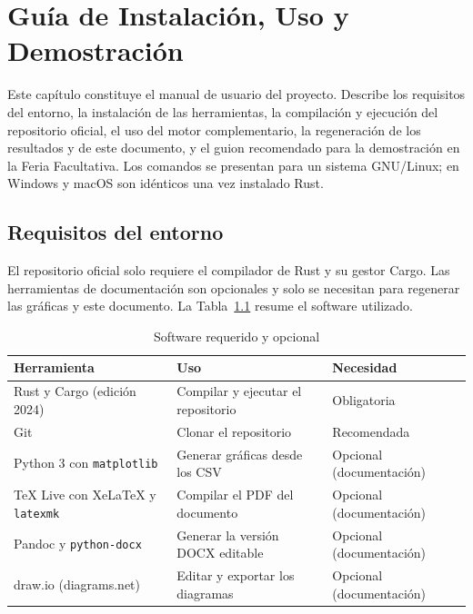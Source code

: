 \chapter{Guía de Instalación, Uso y Demostración}\label{cap:guia}
Este capítulo constituye el manual de usuario del proyecto. Describe los requisitos del entorno, la instalación de las herramientas, la compilación y ejecución del repositorio oficial, el uso del motor complementario, la regeneración de los resultados y de este documento, y el guion recomendado para la demostración en la Feria Facultativa. Los comandos se presentan para un sistema GNU/Linux; en Windows y macOS son idénticos una vez instalado Rust.

\section{Requisitos del entorno}
El repositorio oficial solo requiere el compilador de Rust y su gestor Cargo. Las herramientas de documentación son opcionales y solo se necesitan para regenerar las gráficas y este documento. La Tabla~\ref{tab:requisitos} resume el software utilizado.

\begin{table}[!htbp]
\caption{Software requerido y opcional}\label{tab:requisitos}
\small
\begin{tabularx}{\textwidth}{@{}l l >{\raggedright\arraybackslash}X@{}}
\toprule
Herramienta & Uso & Necesidad \\
\midrule
Rust y Cargo (edición 2024) & Compilar y ejecutar el repositorio & Obligatoria \\
Git & Clonar el repositorio & Recomendada \\
Python 3 con \texttt{matplotlib} & Generar gráficas desde los CSV & Opcional (documentación) \\
TeX Live con XeLaTeX y \texttt{latexmk} & Compilar el PDF del documento & Opcional (documentación) \\
Pandoc y \texttt{python-docx} & Generar la versión DOCX editable & Opcional (documentación) \\
draw.io (diagrams.net) & Editar y exportar los diagramas & Opcional (documentación) \\
\bottomrule
\end{tabularx}
\end{table}

